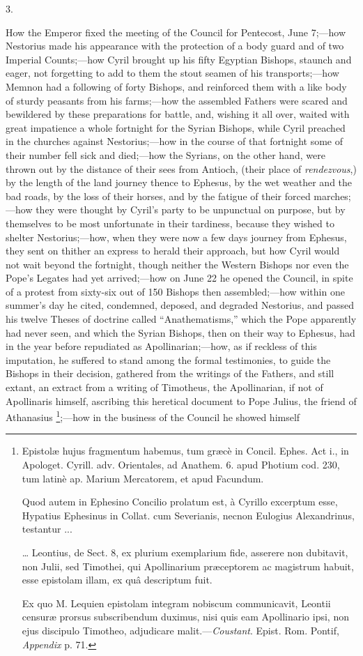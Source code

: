3.

How the Emperor fixed the meeting of the Council for Pentecost,
June 7;—how Nestorius made his appearance with the protection of a
body guard and of two Imperial Counts;—how Cyril brought up his
fifty Egyptian Bishops, staunch and eager, not forgetting to add to
them the stout seamen of his transports;—how Memnon had a following
of forty Bishops, and reinforced them with a like body of sturdy
peasants from his farms;—how the assembled Fathers were scared and
bewildered by these preparations for battle, and, wishing it all over,
waited with great impatience a whole fortnight for the Syrian Bishops,
while Cyril preached in the churches against Nestorius;—how in the
course of that fortnight some of their number fell sick and died;—how
the Syrians, on the other hand, were thrown out by the distance of
their sees from Antioch, (their place of \emph{rendezvous},) by the
length of the land journey thence to Ephesus, by the wet weather and
the bad roads, by the loss of their horses, and by the fatigue of
their forced marches;—how they were thought by Cyril's party to be
unpunctual on purpose, but by themselves to be most unfortunate in
their tardiness, because they wished to shelter Nestorius;—how, when
they were now a few days journey from Ephesus, they sent on thither an
express to herald their approach, but how Cyril would not wait
beyond the fortnight, though neither the Western Bishops nor even the
Pope's Legates had yet arrived;—how on June 22 he opened the
Council, in spite of a protest from sixty-six out of 150 Bishops then
assembled;—how within one summer's day he cited, condemned, deposed,
and degraded Nestorius, and passed his twelve Theses of doctrine
called ``Anathematisms,'' which the Pope apparently had never
seen, and which the Syrian Bishops, then on their way to Ephesus, had
in the year before repudiated as Apollinarian;—how, as if reckless
of this imputation, he suffered to stand among the formal testimonies,
to guide the Bishops in their decision, gathered from the writings of
the Fathers, and still extant, an extract from a writing of Timotheus,
the Apollinarian, if not of Apollinaris himself, ascribing this
heretical document to Pope Julius, the friend of Athanasius \footnote{Epistolæ hujus
fragmentum habemus, tum græcè in Concil. Ephes. Act i., in Apologet.
Cyrill. adv. Orientales, ad Anathem. 6. apud Photium cod. 230, tum
latinè ap. Marium Mercatorem, et apud Facundum.

Quod autem in Ephesino Concilio prolatum est, à Cyrillo excerptum
esse, Hypatius Ephesinus in Collat. cum Severianis, necnon Eulogius
Alexandrinus, testantur ...

… Leontius, de Sect. 8, ex plurium exemplarium fide, asserere non
dubitavit, non Julii, sed Timothei, qui Apollinarium præceptorem ac
magistrum habuit, esse epistolam illam, ex quâ descriptum fuit.

Ex quo M. Lequien epistolam integram nobiscum communicavit, Leontii
censuræ prorsus subscribendum duximus, nisi quis eam Apollinario ipsi,
non ejus discipulo Timotheo, adjudicare malit.—\emph{Coustant}.
Epist. Rom. Pontif, \emph{Appendix} p. 71.};—how in the business of the Council he showed himself
